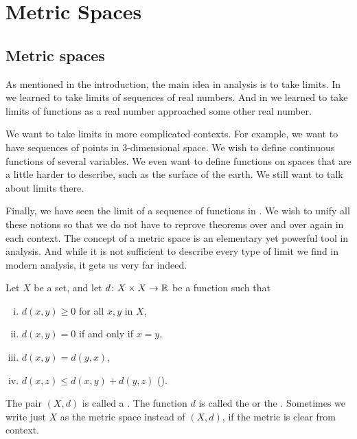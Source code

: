 \chapter{Metric Spaces} \label{ms:chapter}


\section{Metric spaces}
\label{sec:metric}


As mentioned in the introduction, the main idea in analysis is to take
limits.  In  we learned to take limits of sequences of
real numbers.  And in  we learned to take limits
of functions as a real number approached some other real number.

We want to take limits in more complicated contexts.  For
example, we want to have sequences of points in 3-dimensional space.
We wish to define continuous functions of several variables.
We even want to define functions on spaces that are a little harder to
describe, such as the surface of the earth.  We still want to talk about
limits there.

Finally, we have seen the limit of a sequence of
functions in .
We wish to unify all these notions so that we do not have to
reprove theorems over and over again in each context.  The concept of a
metric space is an elementary yet powerful tool in analysis.  And while it
is not sufficient to describe every type of limit we find in modern
analysis, it gets us very far indeed.

\begin{defn}
Let $X$ be a set, and let
$d \colon X \times X \to {\mathbb{R}}$
be a function such that
\begin{enumerate}[(i)]
\item \label{metric:pos} $d(x,y) \geq 0$ for all $x, y$ in $X$,
\item \label{metric:zero} $d(x,y) = 0$ if and only if $x = y$,
\item \label{metric:com} $d(x,y) = d(y,x)$, 
\item \label{metric:triang} $d(x,z) \leq d(x,y)+ d(y,z)$ \qquad (\emph{}).
\end{enumerate}
The pair $(X,d)$ is called a \emph{}.  The
function $d$ is called the \emph{} or the
\emph{}.
Sometimes we write just $X$ as the metric space instead of $(X,d)$, if the metric is clear from
context.
\end{defn}

